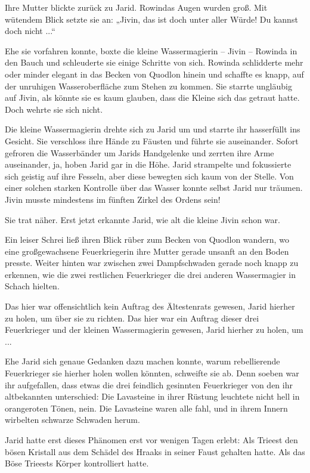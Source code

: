 Ihre Mutter blickte zurück zu Jarid. Rowindas Augen wurden groß. Mit wütendem Blick setzte sie an: „Jivin, das ist doch unter aller Würde! Du kannst doch nicht ...“

Ehe sie vorfahren konnte, boxte die kleine Wassermagierin – Jivin – Rowinda in den Bauch und schleuderte sie einige Schritte von sich. Rowinda schlidderte mehr oder minder elegant in das Becken von Quodlon hinein und schaffte es knapp, auf der unruhigen Wasseroberfläche zum Stehen zu kommen. Sie starrte ungläubig auf Jivin, als könnte sie es kaum glauben, dass die Kleine sich das getraut hatte. Doch wehrte sie sich nicht.

Die kleine Wassermagierin drehte sich zu Jarid um und starrte ihr hasserfüllt ins Gesicht. Sie verschloss ihre Hände zu Fäusten und führte sie auseinander. Sofort gefroren die Wasserbänder um Jarids Handgelenke und zerrten ihre Arme auseinander, ja, hoben Jarid gar in die Höhe. Jarid strampelte und fokussierte sich geistig auf ihre Fesseln, aber diese bewegten sich kaum von der Stelle. Von einer solchen starken Kontrolle über das Wasser konnte selbst Jarid nur träumen. Jivin musste mindestens im fünften Zirkel des Ordens sein!

Sie trat näher. Erst jetzt erkannte Jarid, wie alt die kleine Jivin schon war.

Ein leiser Schrei ließ ihren Blick rüber zum Becken von Quodlon wandern, wo eine großgewachsene Feuerkriegerin ihre Mutter gerade unsanft an den Boden presste. Weiter hinten war zwischen zwei Dampfschwaden gerade noch knapp zu erkennen, wie die zwei restlichen Feuerkrieger die drei anderen Wassermagier in Schach hielten.

Das hier war offensichtlich kein Auftrag des Ältestenrats gewesen, Jarid hierher zu holen, um über sie zu richten. Das hier war ein Auftrag dieser drei Feuerkrieger und der kleinen Wassermagierin gewesen, Jarid hierher zu holen, um ...

Ehe Jarid sich genaue Gedanken dazu machen konnte, warum rebellierende Feuerkrieger sie hierher holen wollen könnten, schweifte sie ab. Denn soeben war ihr aufgefallen, dass etwas die drei feindlich gesinnten Feuerkrieger von den ihr altbekannten unterschied: Die Lavasteine in ihrer Rüstung leuchtete nicht hell in orangeroten Tönen, nein. Die Lavasteine waren alle fahl, und in ihrem Innern wirbelten schwarze Schwaden herum.

Jarid hatte erst dieses Phänomen erst vor wenigen Tagen erlebt: Als Trieest den bösen Kristall aus dem Schädel des Hraaks in seiner Faust gehalten hatte. Als das Böse Trieests Körper kontrolliert hatte.

